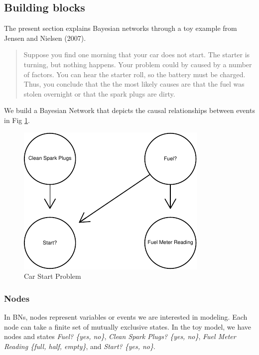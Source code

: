 \documentclass[twocol]{ametsoc}
\begin{document}
\hypertarget{building-blocks}{%
\subsection{Building blocks}\label{building-blocks}}

The present section explains Bayesian networks through a toy example
from Jensen and Nielsen (2007).

\begin{quote}
Suppose you find one morning that your car does not start. The starter
is turning, but nothing happens. Your problem could by caused by a
number of factors. You can hear the starter roll, so the battery must be
charged. Thus, you conclude that the the most likely causes are that the
fuel was stolen overnight or that the spark plugs are dirty.
\end{quote}

We build a Bayesian Network that depicts the causal relationships
between events in Fig \ref{fig:test}.

\begin{figure}

{\centering \includegraphics{paper_files/figure-latex/test-1} 

}

\caption{Car Start Problem}\label{fig:test}
\end{figure}

\hypertarget{nodes}{%
\subsubsection{Nodes}\label{nodes}}

In BNs, nodes represent variables or events we are interested in
modeling. Each node can take a finite set of mutually exclusive states.
In the toy model, we have nodes and states \emph{Fuel? \{yes, no\}},
\emph{Clean Spark Plugs? \{yes, no\}}, \emph{Fuel Meter Reading \{full,
half, empty\}}, and \emph{Start? \{yes, no\}}.
\end{document}
